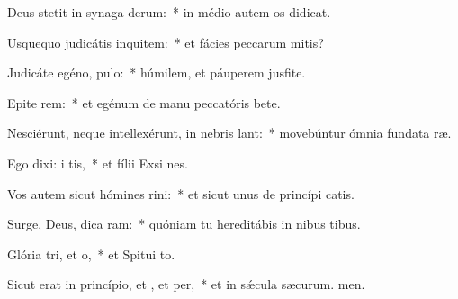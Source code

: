 \item Deus stetit in synaga derum:~* in médio autem os didicat.
\item Usquequo judicátis inquitem:~* et fácies peccarum mitis?
\item Judicáte egéno,  pulo:~* húmilem, et páuperem jusfite.
\item Epite rem:~* et egénum de manu peccatóris bete.
\item Nesciérunt, neque intellexérunt, in nebris lant:~* movebúntur ómnia fundata ræ.
\item Ego dixi: i tis,~* et fílii Exsi nes.
\item Vos autem sicut hómines rini:~* et sicut unus de princípi catis.
\item Surge, Deus, dica ram:~* quóniam tu hereditábis in nibus tibus.
\item Glória tri, et o,~* et Spitui to.
\item Sicut erat in princípio, et , et per,~* et in sǽcula sæcurum. men.
